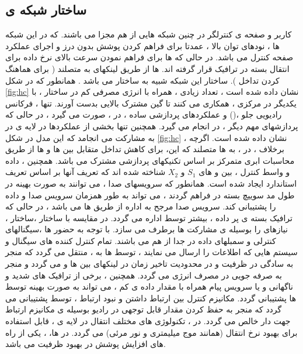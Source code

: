 \subsection{ساختار شبکه ی }
کاربر و صفحه ی کنترلگر در چنین شبکه هایی از هم مجزا می باشند. که در این شبکه ها ، نودهای توان بالا    ، عمدتا برای فراهم کردن پوشش بدون درز و اجرای عملکرد صفحه کنترل می باشد. در حالی که  ها برای فراهم نمودن سرعت بالای نرخ داده برای انتقال بسته در ترافیک قرار گرفته اند.  ها از طریق لینکهای   به  متصلند ( برای هماهنگ کردن تداخل ).\newline
ساختار این شبکه شبیه به ساختار  می باشد . همانطور که در شکل \eqref{fig:hc} نشان داده شده است ، تعداد زیادی  ، همراه با انرژی مصرفی کم در ساختار  ، با یکدیگر در  مرکزی ، همکاری می کنند تا گین مشترک بالایی بدست آورند.   تنها ، فرکانس رادیویی جلو ،() و عملکردهای پردازشی  ساده ، در  ، صورت می گیرد ، در حالی که پردازشهای مهم دیگر ، در  انجام می گیرد. همچنین تنها بخشی از عملکردها در لایه ی  در  به مشارکت می انجامد که این مدل در شکل \eqref{fig:hc} نشان داده شده است.\newline
اگرچه ، برخلاف  ،  در  ، به  ها متصلند که این، برای کاهش تداخل متقابل بین  ها و  ها از طریق محاسبات ابری متمرکز بر اساس تکنیکهای پردازشی مشترک می باشد. همچنین ، داده و واسط کنترل ، بین  و  های $S_1$ و $X_2$ شناخته شده اند که تعریف آنها بر اساس تعریف استاندارد  ایجاد شده است.\newline
همانطور که سرویسهای صدا ، می توانند به صورت بهینه در طول مد سوییچ بسته در  فراهم گردند ،  می تواند به طور همزمان سرویس صدا و داده را پشتیبانی کند. سرویس صدا مرجح به اداره از طریق  ها می باشد ، در حالی که ترافیک بسته ی پر داده ، بیشتر توسط  اداره می گردد. 
در مقایسه با ساختار  ،ساختار  ، نیازهای  را بوسیله ی مشارکت  ها برطرف می سازد. با توجه به حضور  ها ،سیگنالهای کنترلی و سمبلهای داده در  جدا از هم می باشند. تمام کنترل کننده های سیگنال و سیستم هایی که اطلاعات را ارسال می نمایند ، توسط  ها به  ، منتقل می گردد که منجر به سادگی در ظرفیت و در محدودیت تاخیر زمان در لینکهای  بین  ها و   می گردد و منجر به صرفه جویی در مصرف انرژی می گردد. همچنین ، برخی از ترافیک های شدید و ناگهانی  و یا سرویس پیام همراه با مقدار داده ی کم ، می تواند به صورت بهینه توسط  ها پشتیبانی گردد. مکانیزم کنترل بین ارتباط داشتن و نبود ارتباط ، توسط  پشتیبانی می گردد که منجر به حفظ کردن مقدار قابل توجهی  در رادیو بوسیله ی مکانیزم ارتباط جهت دار خالص می گردد. در  ، تکنولوژی های مختلف انتقال در لایه ی  ، قابل استفاده برای بهبود نرخ انتقال (همانند موج میلیمتری و نور مرئی) می گردد. در ها، ، یکی از راه های افزایش پوشش در بهبود ظرفیت می باشد.

